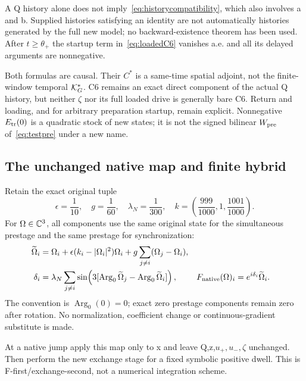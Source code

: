 A Q history alone does not imply~\eqref{eq:historycompatibility}, which also involves a and b. Supplied histories satisfying an identity are not automatically histories generated by the full new model; no backward-existence theorem has been used. After $t\ge\theta_+$ the startup term in~\eqref{eq:loadedC6} vanishes a.e. and all its delayed arguments are nonnegative.

Both formulas are causal. Their $C^*$ is a same-time spatial adjoint, not the finite-window temporal $\mathcal K_G^*$. C6 remains an exact direct component of the actual Q history, but neither $\zeta$ nor its full loaded drive is generally bare C6. Return and loading, and for arbitrary preparation startup, remain explicit. Nonnegative $E_{\rm tr}(0)$ is a quadratic stock of new states; it is not the signed bilinear $W_{\rm pre}$ of~\eqref{eq:testpre} under a new name.

\subsection{The unchanged native map and finite hybrid}\label{sec:native}
Retain the exact original tuple~\cite{RXhybrid}
\begin{equation}\label{eq:nativetuple}
\epsilon=\frac1{10},\quad g=\frac1{60},\quad \lambda_N=\frac1{300},\quad
k=\left(\frac{999}{1000},1,\frac{1001}{1000}\right).
\end{equation}
For $\Omega\in\mathbb C^3$, all components use the same original state for the simultaneous prestage and the same prestage for synchronization:
\begin{align}
\widetilde\Omega_i&=\Omega_i+\epsilon(k_i-|\Omega_i|^2)\Omega_i
+g\sum_{j\ne i}(\Omega_j-\Omega_i),\label{eq:prestage}\\
\delta_i&=\lambda_N\sum_{j\ne i}\sin\!\left(3[\operatorname{Arg}_0\widetilde\Omega_j-\operatorname{Arg}_0\widetilde\Omega_i]\right),
&F_{\rm native}(\Omega)_i&=e^{i\delta_i}\widetilde\Omega_i.\label{eq:nativemap}
\end{align}
The convention is $\operatorname{Arg}_0(0)=0$; exact zero prestage components remain zero after rotation. No normalization, coefficient change or continuous-gradient substitute is made.

At a native jump apply this map only to x and leave Q,z,$u_+,u_-,\zeta$ unchanged. Then perform the new exchange stage for a fixed symbolic positive dwell. This is F-first/exchange-second, not a numerical integration scheme.

